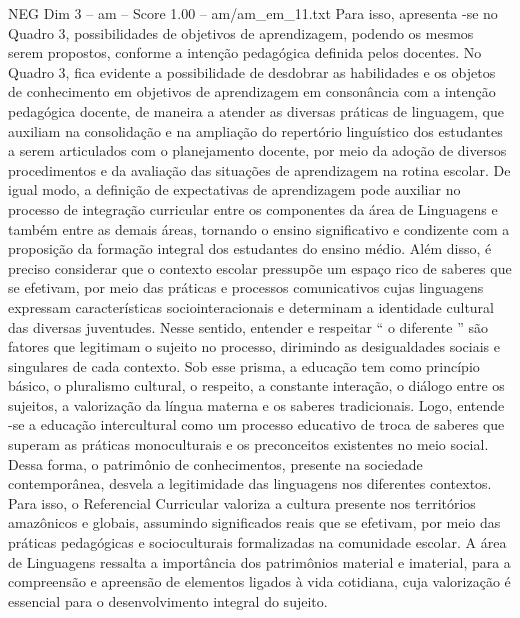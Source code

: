 \begin{textsample}{NEG Dim 3 – am – Score 1.00 – am/am\_em\_11.txt}
Para isso, apresenta -se no Quadro 3, possibilidades de objetivos de aprendizagem, podendo os mesmos serem propostos, conforme a intenção pedagógica definida pelos docentes.
No Quadro 3, fica evidente a possibilidade de desdobrar as habilidades e os objetos de conhecimento em objetivos de aprendizagem em consonância com a intenção pedagógica docente, de maneira a atender as diversas práticas de linguagem, que auxiliam na consolidação e na ampliação do repertório linguístico dos estudantes a serem articulados com o planejamento docente, por meio da adoção de diversos procedimentos e da avaliação das situações de aprendizagem na rotina escolar.
De igual modo, a definição de expectativas de aprendizagem pode auxiliar no processo de integração curricular entre os componentes da área de Linguagens e também entre as demais áreas, tornando o ensino significativo e condizente com a proposição da formação integral dos estudantes do ensino médio.
Além disso, é preciso considerar que o contexto escolar pressupõe um espaço rico de saberes que se efetivam, por meio das práticas e processos comunicativos cujas linguagens expressam características sociointeracionais e determinam a identidade cultural das diversas juventudes.
Nesse sentido, entender e respeitar “ o diferente ” são fatores que legitimam o sujeito no processo, dirimindo as desigualdades sociais e singulares de cada contexto.
Sob esse prisma, a educação tem como princípio básico, o pluralismo cultural, o respeito, a constante interação, o diálogo entre os sujeitos, a valorização da língua materna e os saberes tradicionais.
Logo, entende -se a educação intercultural como um processo educativo de troca de saberes que superam as práticas monoculturais e os preconceitos existentes no meio social.
Dessa forma, o patrimônio de conhecimentos, presente na sociedade contemporânea, desvela a legitimidade das linguagens nos diferentes contextos.
Para isso, o Referencial Curricular valoriza a cultura presente nos territórios amazônicos e globais, assumindo significados reais que se efetivam, por meio das práticas pedagógicas e socioculturais formalizadas na comunidade escolar.
A área de Linguagens ressalta a importância dos patrimônios material e imaterial, para a compreensão e apreensão de elementos ligados à vida cotidiana, cuja valorização é essencial para o desenvolvimento integral do sujeito.

\end{textsample}
